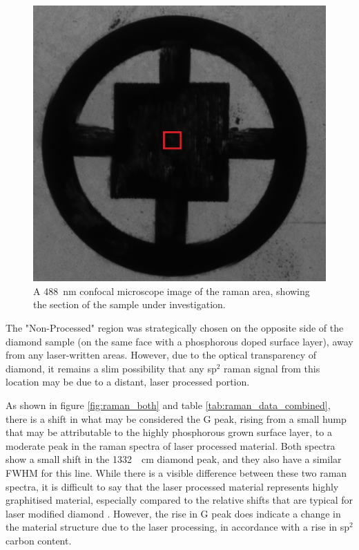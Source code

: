\begin{refsection}
\begin{figure}
  \centering
  \includegraphics[width=\linewidth]{Chapter7/Figs/Raster/raman_section_anno.jpg}
  \caption{A 488~\si{\nano\metre} confocal microscope image of the raman area, showing the section of the sample under investigation.}
  \label{fig:raman_section}
\end{figure}

The "Non-Processed" region was strategically chosen on the opposite side of the diamond sample (on the same face with a phosphorous doped surface layer), away from any laser-written areas. However, due to the optical transparency of diamond, it remains a slim possibility that any sp$^{2}$ raman signal from this location may be due to a distant, laser processed portion. 

As shown in figure \ref{fig:raman_both} and table \ref{tab:raman_data_combined}, there is a shift in what may be considered the G peak, rising from a small hump that may be attributable to the highly phosphorous grown surface layer, to a moderate peak in the raman spectra of laser processed material. Both spectra show a small shift in the 1332~\si{\per\centi\metre} diamond peak, and they also have a similar FWHM for this line. While there is a visible difference between these two raman spectra, it is difficult to say that the laser processed material represents highly graphitised material, especially compared to the relative shifts that are typical for laser modified diamond \cite{kononenko1998, kononenko:2008}. However, the rise in G peak does indicate a change in the material structure due to the laser processing, in accordance with a rise in sp$^{2}$ carbon content.

\printbibliography[heading=subbibliography]
\end{refsection}
